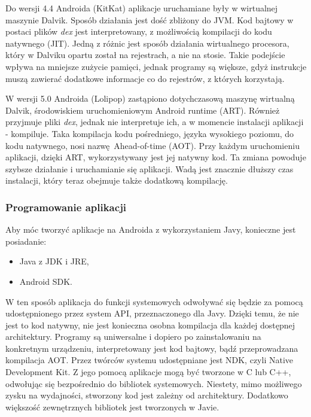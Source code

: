 Do wersji 4.4 Androida (KitKat) aplikacje uruchamiane były w wirtualnej maszynie Dalvik. Sposób działania jest dość zbliżony do JVM. Kod bajtowy w postaci plików \textit{dex} jest interpretowany, z możliwością kompilacji do kodu natywnego (JIT). Jedną z różnic jest sposób działania wirtualnego procesora, który w Dalviku opartu został na rejestrach, a nie na stosie. Takie podejście wpływa na mniejsze zużycie pamięci, jednak programy są większe, gdyż instrukcje muszą zawierać dodatkowe informacje co do rejestrów, z których korzystają.

W wersji 5.0 Androida (Lolipop) zastąpiono dotychczasową maszynę wirtualną Dalvik, środowiskiem uruchomieniowym Android runtime (ART). Również przyjmuje pliki \textit{dex}, jednak nie interpretuje ich, a w momencie instalacji aplikacji - kompiluje. Taka kompilacja kodu pośredniego, języka wysokiego poziomu, do kodu natywnego, nosi nazwę Ahead-of-time (AOT). Przy każdym uruchomieniu aplikacji, dzięki ART, wykorzystywany jest jej natywny kod. Ta zmiana powoduje szybsze działanie i uruchamianie się aplikacji. Wadą jest znacznie dłuższy czas instalacji, który teraz obejmuje także dodatkową kompilację.


\subsubsection*{Programowanie aplikacji}
Aby móc tworzyć aplikacje na Androida z wykorzystaniem Javy, konieczne jest posiadanie:

\begin{itemize}
	\item Java z JDK i JRE,
	\item Android SDK.
\end{itemize}

W ten sposób aplikacja do funkcji systemowych odwoływać się będzie za pomocą udostępnionego przez system API, przeznaczonego dla Javy. Dzięki temu, że nie jest to kod natywny, nie jest konieczna osobna kompilacja dla każdej dostępnej architektury. Programy są uniwersalne i dopiero po zainstalowaniu na konkretnym urządzeniu, interpretowany jest kod bajtowy, bądź przeprowadzana kompilacja AOT. Przez twórców systemu udostępniane jest NDK, czyli Native Development Kit. Z jego pomocą aplikacje mogą być tworzone w C lub C++, odwołując się bezpośrednio do bibliotek systemowych. Niestety, mimo możliwego zysku na wydajności, stworzony kod jest zależny od architektury. Dodatkowo większość zewnętrznych bibliotek jest tworzonych w Javie. 

